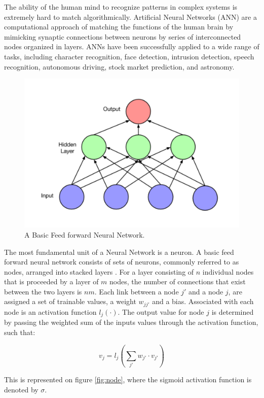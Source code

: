 \documentclass[%
 aip,
 jmp,%
 amsmath,amssymb,
 reprint,%
]{revtex4-1}
\begin{document}
The ability of the human mind to recognize patterns in complex systems is extremely hard to match algorithmically. Artificial Neural Networks (ANN) are a computational approach of matching the functions of the human brain by mimicking synaptic connections between neurons by series of interconnected nodes organized in layers. ANNs have been successfully applied to a wide range of tasks, including character recognition, face detection, intrusion detection, speech recognition, autonomous driving, stock market prediction, and astronomy. 


\begin{figure}
\centering
\includegraphics[width=0.6\linewidth]{basic_net.png}
\caption{A Basic Feed forward Neural Network.}
\label{fig:ANN}
\end{figure}

The most fundamental unit of a Neural Network is a neuron. A basic feed forward neural network consists of sets of neurons, commonly referred to as nodes, arranged into stacked layers \cite{ANN}. For a layer consisting of \(n\) individual nodes that is proceeded by a layer of \(m\) nodes, the number of connections that exist between the two layers is \(nm\). Each link between a node \(j'\) and a node \(j\), are assigned a set of trainable values, a weight \(w_{jj'}\) and a bias. Associated with each node is an activation function \(l_j(\cdot)\). The output value for node \(j\) is determined by passing the weighted sum of the inputs values through the activation function, such that:


\begin{equation}
v_j=l_j(\sum_{j'}w_{j'} \cdot v_{j'})
\end{equation}


This is represented on figure \ref{fig:node}, where the sigmoid activation function is denoted by \(\sigma\). 
\end{document}
